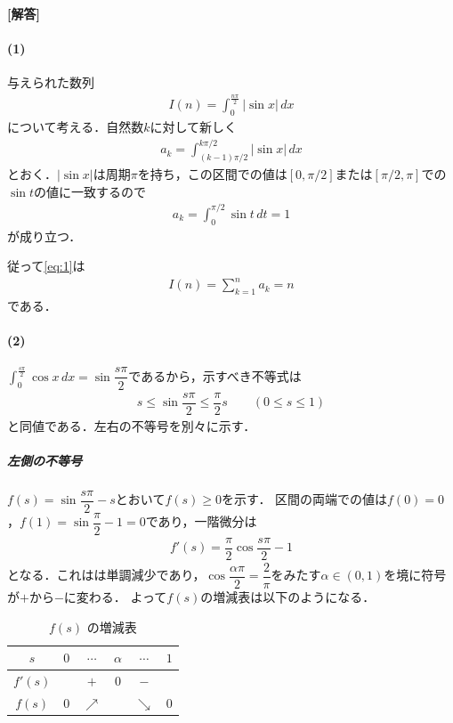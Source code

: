 \documentclass[../../main.tex]{subfiles}
\begin{document}
\begin{oframed}
  
\end{oframed}

{\bf [解答]}
\paragraph{(1)}

与えられた数列
\begin{align}
  I(n) = \int_{0}^{\frac{n\pi}{2}} |\sin x|\, dx \label{eq:1}
\end{align}
について考える．自然数$k$に対して新しく
\begin{align}
  a_k = \int_{(k-1)\pi/2}^{k\pi/2}|\sin x|\,dx
\end{align}
とおく．$|\sin x|$は周期$\pi$を持ち，この区間での値は$[0,\pi/2]$または$[\pi/2,\pi]$での$\sin t$の値に一致するので
\begin{align}
  a_k=\int_0^{\pi/2} \sin t\,dt=1 \label{eq:2}
\end{align}
が成り立つ．

従って\cref{eq:1}は
\begin{align}
  I(n) = \sum_{k=1}^{n} a_k = n \label{eq:3}
\end{align}
である．

\paragraph{(2)}

$\displaystyle\int_0^{\frac{s\pi}{2}}\cos x\,dx=\sin\dfrac{s\pi}{2}$であるから，示すべき不等式は
\begin{align}
  s\le\sin\dfrac{s\pi}{2}\le\dfrac{\pi}{2}s\qquad(0\le s\le1) \label{eq:4}
\end{align}
と同値である．左右の不等号を別々に示す．

\subparagraph{左側の不等号}

$f(s)=\sin\dfrac{s\pi}{2}-s$とおいて$f(s)\ge0$を示す．
区間の両端での値は$f(0)=0$，$f(1)=\sin\dfrac{\pi}{2}-1=0$であり，一階微分は
\begin{align}
  f'(s)=\dfrac{\pi}{2}\cos\dfrac{s\pi}{2}-1
\end{align}
となる．これはは単調減少であり，$\cos\dfrac{\alpha\pi}{2}=\dfrac{2}{\pi}$をみたす$\alpha\in(0,1)$を境に符号が$+$から$-$に変わる．
よって$f(s)$の増減表は以下のようになる．

\begin{table}[htb]
  \centering
  \caption{$f(s)$ の増減表}
  \begin{tabular}{c|ccccc}
    \hline
    $s$ & $0$ & $\cdots$ & $\alpha$ & $\cdots$ & $1$ \\ \hline
    $f'(s)$ & & $+$ & $0$ & $-$ & \\ \hline
    $f(s)$ & $0$ & $\nearrow$ & & $\searrow$ & $0$ \\ \hline
  \end{tabular}
\end{table}
\end{document}
